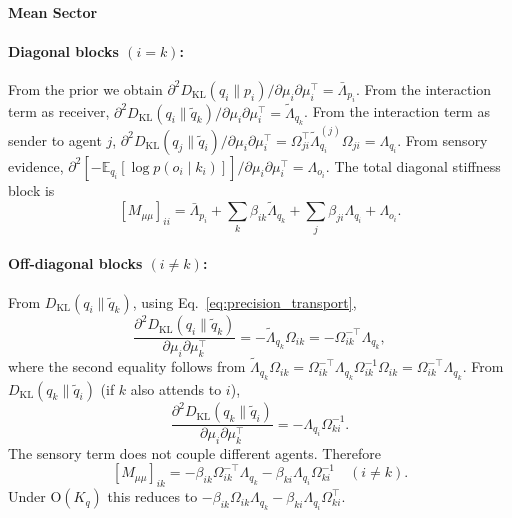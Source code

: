 \documentclass[11pt]{article}
\begin{document}
\paragraph{Mean Sector}

\paragraph{Diagonal blocks $(i = k)$:} From the prior we obtain $\partial^2 D_{\mathrm{KL}}(q_i \| p_i)/\partial \mu_i \partial \mu_i^\top = \bar{\Lambda}_{p_i}$. From the interaction term as receiver, $\partial^2 D_{\mathrm{KL}}(q_i \| \tilde{q}_k)/\partial \mu_i \partial \mu_i^\top = \tilde{\Lambda}_{q_k}$. From the interaction term as sender to agent $j$, $\partial^2 D_{\mathrm{KL}}(q_j \| \tilde{q}_i)/\partial \mu_i \partial \mu_i^\top = \Omega_{ji}^\top \tilde{\Lambda}_{q_i}^{(j)} \Omega_{ji} = \Lambda_{q_i}$. From sensory evidence, $\partial^2[-\mathbb{E}_{q_i}[\log p(o_i \mid k_i)]]/\partial \mu_i \partial \mu_i^\top = \Lambda_{o_i}$. The total diagonal stiffness block is
\begin{equation}
\boxed{[M_{\mu\mu}]_{ii} = \bar{\Lambda}_{p_i} + \sum_k \beta_{ik} \tilde{\Lambda}_{q_k} + \sum_j \beta_{ji} \Lambda_{q_i} + \Lambda_{o_i}.}
\label{eq:mass_mu_diagonal}
\end{equation}

\paragraph{Off-diagonal blocks $(i \neq k)$:} From $D_{\mathrm{KL}}(q_i \| \tilde{q}_k)$, using Eq.~\eqref{eq:precision_transport},
\begin{equation}
\frac{\partial^2 D_{\mathrm{KL}}(q_i \| \tilde{q}_k)}{\partial \mu_i \partial \mu_k^\top} = -\tilde{\Lambda}_{q_k}\Omega_{ik} = -\Omega_{ik}^{-\top}\Lambda_{q_k},
\end{equation}
where the second equality follows from $\tilde{\Lambda}_{q_k}\Omega_{ik} = \Omega_{ik}^{-\top}\Lambda_{q_k}\Omega_{ik}^{-1}\Omega_{ik} = \Omega_{ik}^{-\top}\Lambda_{q_k}$. From $D_{\mathrm{KL}}(q_k \| \tilde{q}_i)$ (if $k$ also attends to $i$),
\begin{equation}
\frac{\partial^2 D_{\mathrm{KL}}(q_k \| \tilde{q}_i)}{\partial \mu_i \partial \mu_k^\top} = -\Lambda_{q_i}\Omega_{ki}^{-1}.
\end{equation}
The sensory term does not couple different agents. Therefore
\begin{equation}
\boxed{[M_{\mu\mu}]_{ik} = -\beta_{ik}\Omega_{ik}^{-\top}\Lambda_{q_k} - \beta_{ki}\Lambda_{q_i}\Omega_{ki}^{-1} \quad (i \neq k).}
\label{eq:mass_mu_offdiagonal}
\end{equation}
Under $\mathrm{O}(K_q)$ this reduces to $-\beta_{ik}\Omega_{ik}\Lambda_{q_k} - \beta_{ki}\Lambda_{q_i}\Omega_{ki}^\top$.
\end{document}
